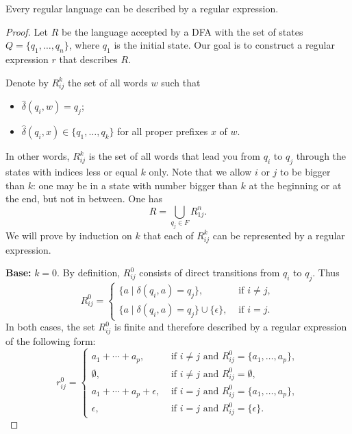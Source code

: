 \begin{page}
\setcounter{section}{2}
\setcounter{subsection}{2}
\setcounter{dfn}{10}
\label{portion:980}

\begin{lem}
Every regular language can be described by a regular expression.
\end{lem}

\end{page}

\begin{page}
\setcounter{section}{2}
\setcounter{subsection}{2}
\setcounter{dfn}{10}
\label{portion:981}

\begin{proof}
Let $R$ be the language accepted by a DFA with the set of states $Q = \{q_1, \ldots, q_n\}$, where $q_1$ is the initial state.
Our goal is to construct a regular expression $r$ that describes $R$.

Denote by $R_{ij}^k$ the set of all words $w$ such that
\begin{itemize}
\item
$\widehat{\delta}(q_i, w) = q_j$;
\item
$\widehat{\delta}(q_i, x) \in \{q_1, \ldots, q_k\}$ for all proper prefixes $x$ of $w$.
\end{itemize}
In other words, $R_{ij}^k$ is the set of all words that lead you from $q_i$ to $q_j$
through the states with indices less or equal $k$ only.
Note that we allow $i$ or $j$ to be bigger than $k$: one may be in a state with number bigger than $k$ at the beginning or at the end, but not in between.
One has
\[
R = \bigcup_{q_j \in F} R_{1j}^n.
\]
We will prove by induction on $k$ that each of $R_{ij}^k$ can be represented by a regular expression.

\textbf{Base:} $k = 0$.
By definition, $R_{ij}^0$ consists of direct transitions from $q_i$ to $q_j$. Thus
\[
R_{ij}^0 =
\begin{cases}
\{a \mid \delta(q_i, a) = q_j\}, &\text{ if } i \ne j,\\
\{a \mid \delta(q_i, a) = q_j\} \cup \{\epsilon\}, &\text{ if } i = j.
\end{cases}
\]
In both cases, the set $R_{ij}^0$ is finite and therefore described by a regular expression of the following form:
\[
r_{ij}^0 =
\begin{cases}
a_1 + \cdots + a_p, &\text{ if } i \ne j \text{ and } R_{ij}^0 = \{a_1, \ldots, a_p\},\\
\emptyset, &\text{ if } i \ne j \text{ and } R_{ij}^0 = \emptyset,\\
a_1 + \cdots + a_p + \epsilon, &\text{ if } i = j \text{ and } R_{ij}^0 = \{a_1, \ldots, a_p\},\\
\epsilon, &\text{ if } i = j \text{ and }R_{ij}^0 = \{\epsilon\}.
\end{cases}
\]


\end{proof}
\end{page}
